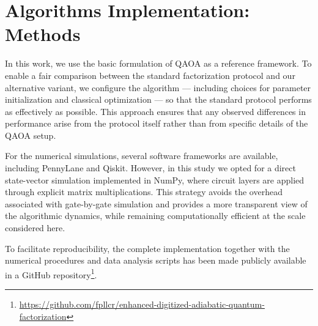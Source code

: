 
\section{Algorithms Implementation: Methods}
\label{Section:Methods}

In this work, we use the basic formulation of QAOA as a reference framework. To enable a fair comparison between the standard factorization protocol and our alternative variant, we configure the algorithm --- including choices for parameter initialization and classical optimization --- so that the standard protocol performs as effectively as possible. This approach ensures that any observed differences in performance arise from the protocol itself rather than from specific details of the QAOA setup.

For the numerical simulations, several software frameworks are available, including PennyLane and Qiskit. However, in this study we opted for a direct state-vector simulation implemented in NumPy, where circuit layers are applied through explicit matrix multiplications. This strategy avoids the overhead associated with gate-by-gate simulation and provides a more transparent view of the algorithmic dynamics, while remaining computationally efficient at the scale considered here.

To facilitate reproducibility, the complete implementation together with the numerical procedures and data analysis scripts has been made publicly available in a GitHub repository\footnote{\url{https://github.com/fpllcr/enhanced-digitized-adiabatic-quantum-factorization}}.
